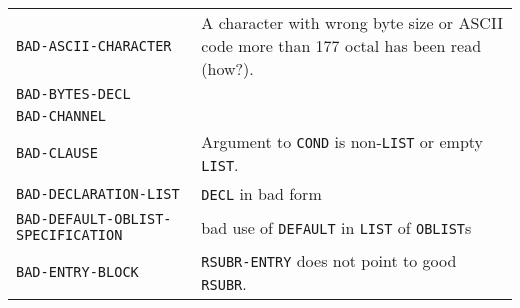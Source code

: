\documentclass[a4paper]{scrbook}
\begin{document}
\begin{longtable}[]{@{}ll@{}}
\begin{minipage}[t]{0.58\columnwidth}
\texttt{BAD-ASCII-CHARACTER}\strut
\end{minipage} & \begin{minipage}[t]{0.36\columnwidth}\raggedright\strut
A character with wrong byte size or ASCII code more than 177 octal has been read (how?).\strut
\end{minipage}\tabularnewline
\begin{minipage}[t]{0.58\columnwidth}\raggedright\strut
\texttt{BAD-BYTES-DECL}\strut
\end{minipage} & \begin{minipage}[t]{0.36\columnwidth}\raggedright\strut
\strut
\end{minipage}\tabularnewline
\begin{minipage}[t]{0.58\columnwidth}\raggedright\strut
\texttt{BAD-CHANNEL}\strut
\end{minipage} & \begin{minipage}[t]{0.36\columnwidth}\raggedright\strut
\strut
\end{minipage}\tabularnewline
\begin{minipage}[t]{0.58\columnwidth}\raggedright\strut
\texttt{BAD-CLAUSE}\strut
\end{minipage} & \begin{minipage}[t]{0.36\columnwidth}\raggedright\strut
Argument to \texttt{COND} is non-\texttt{LIST} or empty \texttt{LIST}.\strut
\end{minipage}\tabularnewline
\begin{minipage}[t]{0.58\columnwidth}\raggedright\strut
\texttt{BAD-DECLARATION-LIST}\strut
\end{minipage} & \begin{minipage}[t]{0.36\columnwidth}\raggedright\strut
\texttt{DECL} in bad form\strut
\end{minipage}\tabularnewline
\begin{minipage}[t]{0.58\columnwidth}\raggedright\strut
\texttt{BAD-DEFAULT-OBLIST-SPECIFICATION}\strut
\end{minipage} & \begin{minipage}[t]{0.36\columnwidth}\raggedright\strut
bad use of \texttt{DEFAULT} in \texttt{LIST} of \texttt{OBLIST}s\strut
\end{minipage}\tabularnewline
\begin{minipage}[t]{0.58\columnwidth}\raggedright\strut
\texttt{BAD-ENTRY-BLOCK}\strut
\end{minipage} & \begin{minipage}[t]{0.36\columnwidth}\raggedright\strut
\texttt{RSUBR-ENTRY} does not point to good \texttt{RSUBR}.\strut

\end{minipage}
\end{longtable}
\end{document}
